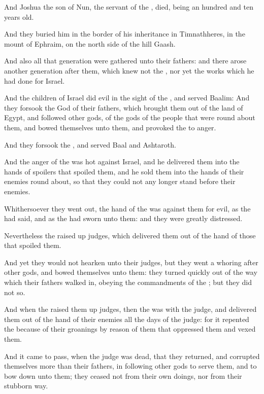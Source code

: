 \Verse And Joshua the son of Nun, the servant of the \LORD, died, being an hundred and ten years old.

\Verse And they buried him in the border of his inheritance in Timnathheres, in the mount of Ephraim, on the north side of the hill Gaash.

\Verse And also all that generation were gathered unto their fathers: and there arose another generation after them, which knew not the \LORD, nor yet the works which he had done for Israel.

\Verse And the children of Israel did evil in the sight of the \LORD, and served Baalim: \Verse And they forsook the \LORD God of their fathers, which brought them out of the land of Egypt, and followed other gods, of the gods of the people that were round about them, and bowed themselves unto them, and provoked the \LORD to anger.

\Verse And they forsook the \LORD, and served Baal and Ashtaroth.

\Verse And the anger of the \LORD was hot against Israel, and he delivered them into the hands of spoilers that spoiled them, and he sold them into the hands of their enemies round about, so that they could not any longer stand before their enemies.

\Verse Whithersoever they went out, the hand of the \LORD was against them for evil, as the \LORD had said, and as the \LORD had sworn unto them: and they were greatly distressed.

\Verse Nevertheless the \LORD raised up judges, which delivered them out of the hand of those that spoiled them.

\Verse And yet they would not hearken unto their judges, but they went a whoring after other gods, and bowed themselves unto them: they turned quickly out of the way which their fathers walked in, obeying the commandments of the \LORD; but they did not so.

\Verse And when the \LORD raised them up judges, then the \LORD was with the judge, and delivered them out of the hand of their enemies all the days of the judge: for it repented the \LORD because of their groanings by reason of them that oppressed them and vexed them.

\Verse And it came to pass, when the judge was dead, that they returned, and corrupted themselves more than their fathers, in following other gods to serve them, and to bow down unto them; they ceased not from their own doings, nor from their stubborn way.

